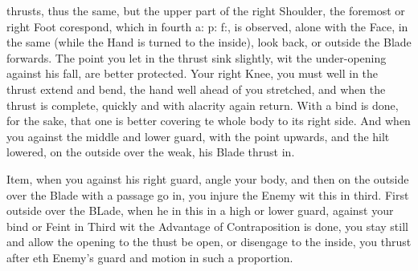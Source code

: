 \newpage


\newpage


thrusts, thus the same, but the upper part of the right Shoulder, the
foremost or right Foot corespond, which in fourth a: p: f:, is
observed, alone with the Face, in the same (while the Hand is turned
to the inside), look back, or outside the Blade forwards. The point
you let in the thrust sink slightly, wit the under-opening against his
fall, are better protected. Your right Knee, you must well in the
thrust extend and bend, the hand well ahead of you stretched, and when
the thrust is complete, quickly and with alacrity again return. With a
bind is done, for the sake, that one is better covering te whole body
to its right side. And when you against the middle and lower guard,
with the point upwards, and the hilt lowered, on the outside over the
weak, his Blade thrust in.


Item, when you against his right guard, angle your body, and then on
the outside over the Blade with a passage go in, you injure the Enemy
wit this in third. First outside over the BLade, when he in this in a
high or lower guard, against your bind or Feint in Third wit the
Advantage of Contraposition is done, you stay still and allow the
opening to the thust be open, or disengage to the inside, you thrust
after eth Enemy's guard and motion in such a proportion.

